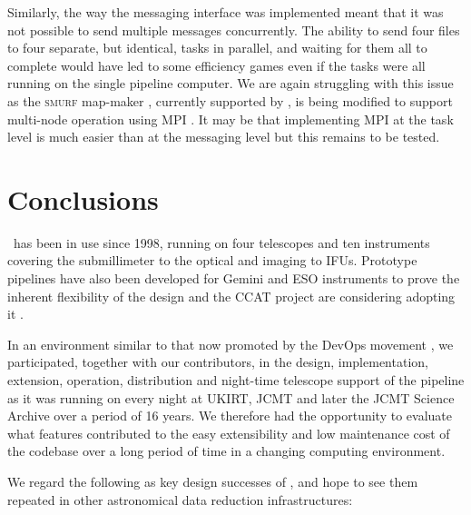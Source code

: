 \documentclass[final,authoryear,5p,times,twocolumn]{elsarticle}
\begin{document}
Similarly, the way the messaging interface was implemented meant that
it was not possible to send multiple messages concurrently. The
ability to send four files to four separate, but identical, tasks in
parallel, and waiting for them all to complete would have led to some
efficiency games even if the tasks were all running on the single
pipeline computer. We are again struggling with this issue as
the \textsc{smurf} map-maker \citep[][]{2013MNRAS.430.2545C}, currently supported by
\oracdr, is being modified to support
multi-node operation using MPI \citep{2014ASPC..485..399M}. It may be
that implementing MPI at the task level is much easier than at the
messaging level but this remains to be tested.

\section{Conclusions}

\oracdr\ has been in use since 1998, running on four telescopes and ten
instruments covering the submillimeter to the optical and imaging to
IFUs. Prototype pipelines have also been developed for Gemini and ESO
instruments to prove the inherent flexibility of the design
\citep{2003ASPC..295..237C,2004ASPC..314..460C} and the CCAT project
are considering adopting it \citep{2014SPIE9152-109}.

In an environment similar to that now promoted by the DevOps movement
\citep[see e.g.,][]{2014arXiv1407.6463E},
we participated, together with our contributors, in the design,
implementation, extension, operation, distribution and night-time
telescope support of the pipeline as it was running on every night at
UKIRT, JCMT and later the JCMT Science Archive over a period of 16
years. We therefore had the opportunity to evaluate what features
contributed to the easy extensibility and low maintenance cost of the
codebase over a long period of time in a changing computing environment.

We regard the following as key design successes of \oracdr, and hope
to see them repeated in other astronomical data reduction
infrastructures:
\end{document}
